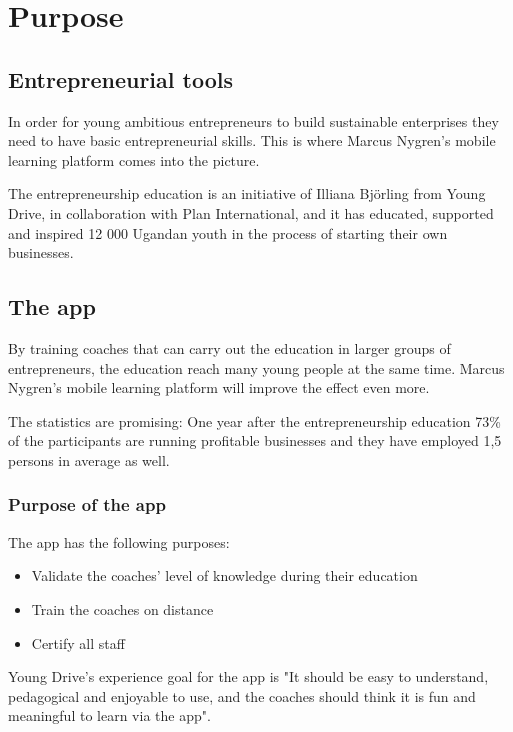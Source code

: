 \section{Purpose}

\subsection{Entrepreneurial tools}
In order for young ambitious entrepreneurs to build sustainable enterprises they need to have basic entrepreneurial skills. This is where Marcus Nygren’s mobile learning platform comes into the picture.

The entrepreneurship education is an initiative of Illiana Björling from Young Drive, in collaboration with Plan International, and it has educated, supported and inspired 12 000 Ugandan youth in the process of starting their own businesses.

\subsection{The app}

By training coaches that can carry out the education in larger groups of entrepreneurs, the education reach many young people at the same time. Marcus Nygren’s mobile learning platform will improve the effect even more.

The statistics are promising: One year after the entrepreneurship education 73\% of the participants are running profitable businesses and they have employed 1,5 persons in average as well. \cite{nissar-linkedin}

\subsubsection{Purpose of the app}
The app has the following purposes:

\begin{itemize}
  \item Validate the coaches' level of knowledge during their education
    \item Train the coaches on distance
    \item Certify all staff
\end{itemize}

Young Drive's experience goal for the app is "It should be easy to understand, pedagogical and enjoyable to use, and the coaches should think it is fun and meaningful to learn via the app".


